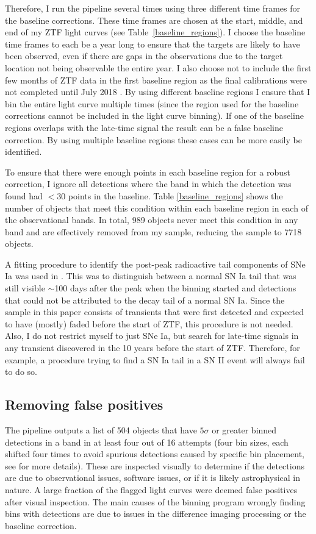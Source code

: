 \documentclass[a4paper,oneside,12pt, class=Latex/Classes/PhDthesisPSnPDF, crop=false]{standalone}
\begin{document}
Therefore, I run the pipeline several times using three different time frames for the baseline corrections. These time frames are chosen at the start, middle, and end of my ZTF light curves (see Table~\ref{baseline_regions}). I choose the baseline time frames to each be a year long to ensure that the targets are likely to have been observed, even if there are gaps in the observations due to the target location not being observable the entire year. I also choose not to include the first few months of ZTF data in the first baseline region as the final calibrations were not completed until July 2018 \citep{ZTF_overview_and_1st_results}. By using different baseline regions I ensure that I bin the entire light curve multiple times (since the region used for the baseline corrections cannot be included in the light curve binning). If one of the baseline regions overlaps with the late-time signal the result can be a false baseline correction. By using multiple baseline regions these cases can be more easily be identified. 

To ensure that there were enough points in each baseline region for a robust correction, I ignore all detections where the band in which the detection was found had $< 30$ points in the baseline. Table \ref{baseline_regions} shows the number of objects that meet this condition within each baseline region in each of the observational bands. In total, 989 objects never meet this condition in any band and are effectively removed from my sample, reducing the sample to 7718 objects.

A fitting procedure to identify the post-peak radioactive tail components of SNe Ia was used in \citet{Terwel_2024_paper1}. This was to distinguish between a normal SN Ia tail that was still visible $\sim$100 days after the peak when the binning started and detections that could not be attributed to the decay tail of a normal SN Ia. Since the sample in this paper consists of transients that were first detected and expected to have (mostly) faded before the start of ZTF, this procedure is not needed. Also, I do not restrict myself to just SNe Ia, but search for late-time signals in any transient discovered in the 10 years before the start of ZTF. Therefore, for example, a procedure trying to find a SN Ia tail in a SN II event will always fail to do so.


\subsection{Removing false positives}
\label{sec:false_positives}
The pipeline outputs a list of 504 objects that have $5\sigma$ or greater binned detections in a band in at least four out of 16 attempts (four bin sizes, each shifted four times to avoid spurious detections caused by specific bin placement, see \citealt{Terwel_2024_paper1} for more details). These are inspected visually to determine if the detections are due to observational issues, software issues, or if it is likely astrophysical in nature. A large fraction of the flagged light curves were deemed false positives after visual inspection. The main causes of the binning program wrongly finding bins with detections are due to issues in the difference imaging processing or the baseline correction.
\end{document}
